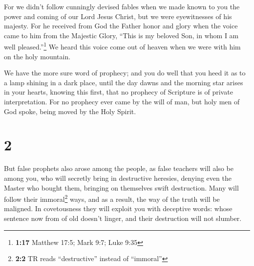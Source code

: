  For we didn't follow cunningly devised fables when we
made known to you the power and coming of our Lord Jesus Christ, but we
were eyewitnesses of his majesty.  For he received from
God the Father honor and glory when the voice came to him from the
Majestic Glory, ``This is my beloved Son, in whom I am well
pleased.''\footnote{\textbf{1:17} Matthew 17:5; Mark 9:7; Luke 9:35}
 We heard this voice come out of heaven when we were with
him on the holy mountain.

 We have the more sure word of prophecy; and you do well
that you heed it as to a lamp shining in a dark place, until the day
dawns and the morning star arises in your hearts, 
knowing this first, that no prophecy of Scripture is of private
interpretation.  For no prophecy ever came by the will of
man, but holy men of God spoke, being moved by the Holy Spirit.

\hypertarget{section-1}{%
\section{2}\label{section-1}}

 But false prophets also arose among the people, as false
teachers will also be among you, who will secretly bring in destructive
heresies, denying even the Master who bought them, bringing on
themselves swift destruction.  Many will follow their
immoral\footnote{\textbf{2:2} TR reads ``destructive'' instead of
  ``immoral''} ways, and as a result, the way of the truth will be
maligned.  In covetousness they will exploit you with
deceptive words: whose sentence now from of old doesn't linger, and
their destruction will not slumber.

